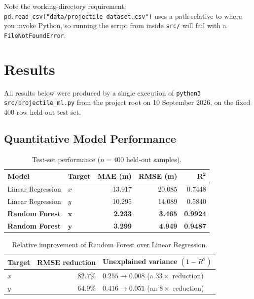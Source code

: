 \documentclass[11pt,a4paper]{article}
\newcommand{\Rsq}{R^{2}}
\begin{document}
Note the working-directory requirement: \texttt{pd.read\_csv("data/projectile\_dataset.csv")} uses a
path relative to where you invoke Python, so running the script from inside \texttt{src/} will fail
with a \texttt{FileNotFoundError}.

\section{Results}\label{sec:results}

All results below were produced by a single execution of \texttt{python3 src/projectile\_ml.py}
from the project root on 10 September 2026, on the fixed 400-row held-out test set.

\subsection{Quantitative Model Performance}\label{sec:quant}

\begin{table}[h]
\centering
\caption{Test-set performance ($n=400$ held-out samples).}
\label{tab:main}
\begin{tabular}{@{}llrrr@{}}
\toprule
\textbf{Model} & \textbf{Target} & \textbf{MAE (m)} & \textbf{RMSE (m)} & $\boldsymbol{\Rsq}$ \\
\midrule
Linear Regression        & $x$ & 13.917 & 20.085 & 0.7448 \\
Linear Regression        & $y$ & 10.295 & 14.089 & 0.5840 \\
\midrule
\textbf{Random Forest}   & $\boldsymbol{x}$ & \textbf{2.233} & \textbf{3.465} & \textbf{0.9924} \\
\textbf{Random Forest}   & $\boldsymbol{y}$ & \textbf{3.299} & \textbf{4.949} & \textbf{0.9487} \\
\bottomrule
\end{tabular}
\end{table}

\begin{table}[h]
\centering
\small
\caption{Relative improvement of Random Forest over Linear Regression.}
\begin{tabular}{@{}lrl@{}}
\toprule
\textbf{Target} & \textbf{RMSE reduction} &
\textbf{Unexplained variance $(1-\Rsq)$} \\
\midrule
$x$ & $82.7\%$ & $0.255 \rightarrow 0.008$ (a $33\times$ reduction) \\
$y$ & $64.9\%$ & $0.416 \rightarrow 0.051$ (an $8\times$ reduction) \\
\bottomrule
\end{tabular}
\end{table}
\end{document}
